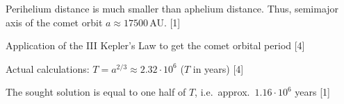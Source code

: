 Perihelium distance is much smaller than aphelium distance.
Thus, semimajor axis of the comet orbit $a \approx 17500$\,AU. \hfill[1]

Application of the III Kepler's Law to get the comet orbital period \hfill[4]

Actual calculations:
$T = a^{2/3} \approx 2.32\cdot 10^{6}$ ($T$ in years)
\hfill[4]

The sought solution is equal to one half of $T$, i.e.\ approx.\
$1.16\cdot 10^{6}$ years \hfill[1]
